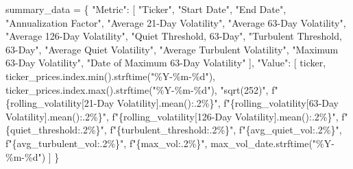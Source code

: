\documentclass[
  11pt,
]{article}
\newenvironment{Shaded}{}{}
\newcommand{\BuiltInTok}[1]{\textcolor[rgb]{0.00,0.50,0.00}{#1}}
\newcommand{\NormalTok}[1]{#1}
\newcommand{\OperatorTok}[1]{\textcolor[rgb]{0.40,0.40,0.40}{#1}}
\newcommand{\SpecialCharTok}[1]{\textcolor[rgb]{0.25,0.44,0.63}{#1}}
\newcommand{\SpecialStringTok}[1]{\textcolor[rgb]{0.73,0.40,0.53}{#1}}
\newcommand{\StringTok}[1]{\textcolor[rgb]{0.25,0.44,0.63}{#1}}
\begin{document}
\begin{Shaded}
\begin{Highlighting}[]
\NormalTok{summary\_data }\OperatorTok{=}\NormalTok{ \{}
    \StringTok{"Metric"}\NormalTok{: [}
        \StringTok{"Ticker"}\NormalTok{,}
        \StringTok{"Start Date"}\NormalTok{,}
        \StringTok{"End Date"}\NormalTok{,}
        \StringTok{"Annualization Factor"}\NormalTok{,}
        \StringTok{"Average 21{-}Day Volatility"}\NormalTok{,}
        \StringTok{"Average 63{-}Day Volatility"}\NormalTok{,}
        \StringTok{"Average 126{-}Day Volatility"}\NormalTok{,}
        \StringTok{"Quiet Threshold, 63{-}Day"}\NormalTok{,}
        \StringTok{"Turbulent Threshold, 63{-}Day"}\NormalTok{,}
        \StringTok{"Average Quiet Volatility"}\NormalTok{,}
        \StringTok{"Average Turbulent Volatility"}\NormalTok{,}
        \StringTok{"Maximum 63{-}Day Volatility"}\NormalTok{,}
        \StringTok{"Date of Maximum 63{-}Day Volatility"}
\NormalTok{    ],}
    \StringTok{"Value"}\NormalTok{: [}
\NormalTok{        ticker,}
\NormalTok{        ticker\_prices.index.}\BuiltInTok{min}\NormalTok{().strftime(}\StringTok{"\%Y{-}\%m{-}}\SpecialCharTok{\%d}\StringTok{"}\NormalTok{),}
\NormalTok{        ticker\_prices.index.}\BuiltInTok{max}\NormalTok{().strftime(}\StringTok{"\%Y{-}\%m{-}}\SpecialCharTok{\%d}\StringTok{"}\NormalTok{),}
        \StringTok{"sqrt(252)"}\NormalTok{,}
        \SpecialStringTok{f"}\SpecialCharTok{\{}\NormalTok{rolling\_volatility[}\StringTok{\textquotesingle{}21{-}Day Volatility\textquotesingle{}}\NormalTok{]}\SpecialCharTok{.}\NormalTok{mean()}\SpecialCharTok{:.2\%\}}\SpecialStringTok{"}\NormalTok{,}
        \SpecialStringTok{f"}\SpecialCharTok{\{}\NormalTok{rolling\_volatility[}\StringTok{\textquotesingle{}63{-}Day Volatility\textquotesingle{}}\NormalTok{]}\SpecialCharTok{.}\NormalTok{mean()}\SpecialCharTok{:.2\%\}}\SpecialStringTok{"}\NormalTok{,}
        \SpecialStringTok{f"}\SpecialCharTok{\{}\NormalTok{rolling\_volatility[}\StringTok{\textquotesingle{}126{-}Day Volatility\textquotesingle{}}\NormalTok{]}\SpecialCharTok{.}\NormalTok{mean()}\SpecialCharTok{:.2\%\}}\SpecialStringTok{"}\NormalTok{,}
        \SpecialStringTok{f"}\SpecialCharTok{\{}\NormalTok{quiet\_threshold}\SpecialCharTok{:.2\%\}}\SpecialStringTok{"}\NormalTok{,}
        \SpecialStringTok{f"}\SpecialCharTok{\{}\NormalTok{turbulent\_threshold}\SpecialCharTok{:.2\%\}}\SpecialStringTok{"}\NormalTok{,}
        \SpecialStringTok{f"}\SpecialCharTok{\{}\NormalTok{avg\_quiet\_vol}\SpecialCharTok{:.2\%\}}\SpecialStringTok{"}\NormalTok{,}
        \SpecialStringTok{f"}\SpecialCharTok{\{}\NormalTok{avg\_turbulent\_vol}\SpecialCharTok{:.2\%\}}\SpecialStringTok{"}\NormalTok{,}
        \SpecialStringTok{f"}\SpecialCharTok{\{}\NormalTok{max\_vol}\SpecialCharTok{:.2\%\}}\SpecialStringTok{"}\NormalTok{,}
\NormalTok{        max\_vol\_date.strftime(}\StringTok{"\%Y{-}\%m{-}}\SpecialCharTok{\%d}\StringTok{"}\NormalTok{)}
\NormalTok{    ]}
\NormalTok{\}}


\end{Highlighting}
\end{Shaded}
\end{document}
